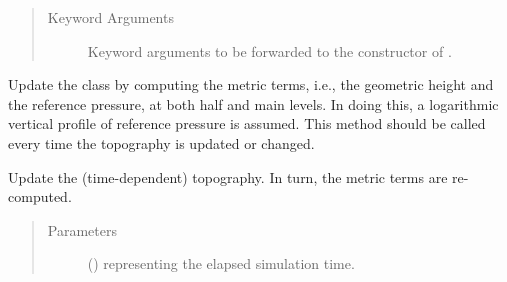 \documentclass[letterpaper,10pt,english]{sphinxmanual}
\begin{document}
\begin{fulllineitems}
\begin{fulllineitems}
\begin{quote}
\begin{description}
\begin{itemize}
\end{itemize}

\item[{Keyword Arguments}] \leavevmode
{} \textendash{} Keyword arguments to be forwarded to the constructor of {\hyperref[\detokenize{api:tasmania.grids.topography.Topography2d}]{}}.

\end{description}\end{quote}

\end{fulllineitems}


\begin{fulllineitems}
\label{\detokenize{api:tasmania.grids.sleve.SLEVE3d._update_metric_terms}}
Update the class by computing the metric terms, i.e., the geometric height and the reference pressure,
at both half and main levels. In doing this, a logarithmic vertical profile of reference pressure is assumed.
This method should be called every time the topography is updated or changed.

\end{fulllineitems}


\begin{fulllineitems}
\label{\detokenize{api:tasmania.grids.sleve.SLEVE3d.update_topography}}
Update the (time-dependent) topography. In turn, the metric terms are re-computed.
\begin{quote}\begin{description}
\item[{Parameters}] \leavevmode
{} () \textendash{}  representing the elapsed simulation time.

\end{description}\end{quote}

\end{fulllineitems}


\end{fulllineitems}
\end{document}

